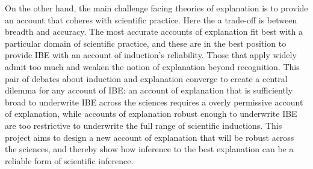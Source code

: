 \documentclass{article}[11pt]
\begin{document}

On the other hand, the main challenge facing theories of explanation is to provide an account that coheres with scientific practice.  Here the a trade-off is between breadth and accuracy.  The most accurate accounts of explanation fit best with a particular domain of scientific practice, and these are in the best position to provide IBE with an account of induction's reliability.  Those that apply widely admit too much and weaken the notion of explanation beyond recognition.  This pair of debates about induction and explanation converge to create a central dilemma for any account of IBE: an account of explanation that is sufficiently broad to underwrite IBE across the sciences requires a overly permissive account of explanation, while accounts of explanation robust enough to underwrite IBE are too restrictive to underwrite the full range of scientific inductions.  This project aims to design a new account of explanation that will be robust across the sciences, and thereby show how inference to the best explanation can be a reliable form of scientific inference.
\end{document}
